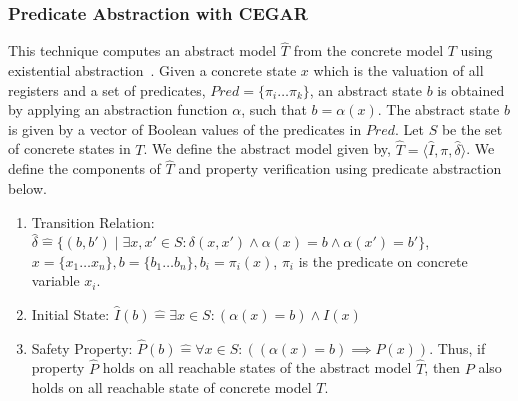 \subsubsection{Predicate Abstraction with CEGAR}
%
This technique computes an abstract model $\hat{T}$ from the concrete model
$T$ using existential abstraction~\cite{cav97,cav2000}. 
%
Given a concrete state $x$ which is the 
valuation of all registers and a set of 
predicates, $Pred=\{\pi_{i} \ldots \pi_{k}\}$, 
an abstract state $b$ is obtained by applying 
an abstraction function $\alpha$, such that $b=\alpha(x)$.  
%
The abstract state $b$ is given by a vector 
of Boolean values of the predicates in $Pred$. 
%
Let $S$ be the set of concrete states in $T$. 
%
We define the abstract model given by, 
$\hat{T} = \langle \hat{I}, \pi, \hat{\delta} \rangle$.  
We define the components of $\hat{T}$ and property 
verification using predicate abstraction below. 
%
\begin{enumerate}
\item Transition Relation: $\hat{\delta} \mathrel{\hat{=}} \{(b,b') \mid \exists x,x' \in S: \delta(x,x') 
\wedge \alpha(x) = b \wedge \alpha(x') = b' \} $, $x=\{x_1 \ldots x_n\}, 
b=\{b_1 \ldots b_n\}, b_i=\pi_{i}(x) $, $\pi_i$ is the predicate on concrete variable $x_i$.

\item Initial State: $\hat{I}(b) \mathrel{\hat{=}} 
\exists x \in S: (\alpha(x) = b) \wedge I(x)$

\item Safety Property: $\hat{P}(b) \mathrel{\hat{=}} 
\forall x \in S: ((\alpha(x) = b) \implies P(x))$.  
Thus, if property $\hat{P}$ holds on all reachable states of the abstract model $\hat{T}$,
then $P$ also holds on all reachable state of concrete model $T$.
\end{enumerate}

